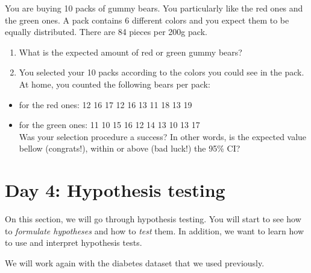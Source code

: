 \documentclass[
]{book}
\newenvironment{Shaded}{\begin{snugshade}}{\end{snugshade}}
\newcommand{\CommentTok}[1]{\textcolor[rgb]{0.56,0.35,0.01}{\textit{#1}}}
\newcommand{\FunctionTok}[1]{\textcolor[rgb]{0.13,0.29,0.53}{\textbf{#1}}}
\newcommand{\NormalTok}[1]{#1}
\newcommand{\OtherTok}[1]{\textcolor[rgb]{0.56,0.35,0.01}{#1}}
\newcommand{\SpecialCharTok}[1]{\textcolor[rgb]{0.81,0.36,0.00}{\textbf{#1}}}
\newcommand{\StringTok}[1]{\textcolor[rgb]{0.31,0.60,0.02}{#1}}
\providecommand{\tightlist}{%
  \setlength{\itemsep}{0pt}\setlength{\parskip}{0pt}}
\begin{document}
You are buying 10 packs of gummy bears. You particularly like the red ones and the green ones. A pack contains 6 different colors and you expect them to be equally distributed. There are 84 pieces per 200g pack.

\begin{enumerate}
\def\labelenumi{\arabic{enumi}.}
\item
  What is the expected amount of red or green gummy bears?
\item
  You selected your 10 packs according to the colors you could see in the pack. At home, you counted the following bears per pack:
\end{enumerate}

\begin{itemize}
\tightlist
\item
  for the red ones: 12 16 17 12 16 13 11 18 13 19\\
\item
  for the green ones: 11 10 15 16 12 14 13 10 13 17\\
  Was your selection procedure a success? In other words, is the expected value bellow (congrats!), within or above (bad luck!) the 95\% CI?
\end{itemize}

\hypertarget{day-4-hypothesis-testing}{%
\section{Day 4: Hypothesis testing}\label{day-4-hypothesis-testing}}

On this section, we will go through hypothesis testing. You will start to see how to \emph{formulate hypotheses} and how to \emph{test} them.
In addition, we want to learn how to use and interpret hypothesis tests.

We will work again with the diabetes dataset that we used previously.

\begin{Shaded}
\end{Shaded}
\end{document}
